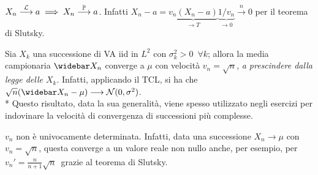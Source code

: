 \medskip
\begin{nb}$X_n \stackrel{\mathcal L}{\longrightarrow} a \implies X_n \stackrel{\mathbb P}{\longrightarrow} a$. Infatti
  $X_n - a = \underbrace{v_n(X_n-a)}_{\to T}\underbrace{1/v_n}_{\to 0} \xrightarrow{n} 0$ per il teorema di Slutsky.
\end{nb}

\begin{ese}
  Sia $X_k$ una successione di VA iid in $L^2$ con $\sigma_k^2 > 0 \enspace \forall k$; allora la media campionaria $\widebar X_n$ converge a $\mu$ con velocità $v_n = \sqrt n$, \emph{a prescindere dalla legge delle $X_k$}.
  Infatti, applicando il TCL, si ha che $\sqrt{n}(\widebar X_n - \mu) \longrightarrow \Nc(0, \sigma^2)$. \\*
  Questo risultato, data la sua generalità, viene spesso utilizzato negli esercizi per indovinare la velocità di convergenza di successioni più complesse.
\end{ese}

\medskip
\begin{nb}
  $v_n$ non è univocamente determinata. Infatti, data una successione $X_n \to \mu$ con $v_n = \sqrt{n}$, questa converge a un valore reale non nullo anche, per esempio, per $v_n' = \frac{n}{n+1}\sqrt{n} \,$ grazie al teorema di Slutsky.
\end{nb}


